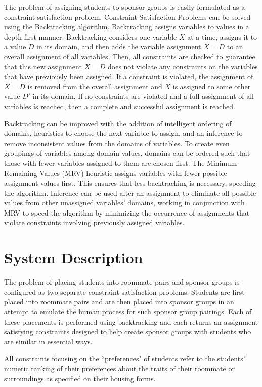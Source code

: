 \documentclass[letterpaper]{article}
\begin{document}
The problem of assigning students to sponsor groups is easily formulated as a constraint satisfaction problem. Constraint Satisfaction Problems can be solved using the Backtracking algorithm. Backtracking assigns variables to values in a depth-first manner. Backtracking considers one variable $X$ at a time, assigns it to a value $D$  in its domain, and then adds the variable assignment $X=D$ to an overall assignment of all variables. Then, all constraints are checked to guarantee that this new assignment $X=D$ does not violate any constraints on the variables that have previously been assigned. If a constraint is violated, the assignment of $X=D$ is removed from the overall assignment and $X$ is assigned to some other value $D'$ in its domain. If no constraints are violated and a full assignment of all variables is reached, then a complete and successful assignment is reached. 

Backtracking can be improved with the addition of intelligent ordering of domains, heuristics to choose the next variable to assign, and an inference to remove inconsistent values from the domains of variables. To create even groupings of variables among domain values, domains can be ordered such that those with fewer variables assigned to them are chosen first. The Minimum Remaining Values (MRV) heuristic assigns variables with fewer possible assignment values first. This ensures that less backtracking is necessary, speeding the algorithm. Inference can be used after an assignment to eliminate all possible values from other unassigned variables' domains, working in conjunction with MRV to speed the algorithm by minimizing the occurrence of assignments that violate constraints involving previously assigned variables. 

\section{System Description}
The problem of placing students into roommate pairs and sponsor groups is configured as two separate constraint satisfaction problems. Students are first placed into roommate pairs and are then placed into sponsor groups in an attempt to emulate the human process for such sponsor group pairings. Each of these placements is performed using backtracking and each returns an assignment satisfying constraints designed to help create sponsor groups with students who are similar in essential ways.

All constraints focusing on the ``preferences" of students refer to the students'  numeric ranking of their preferences about the traits of their roommate or surroundings as specified on their housing forms.
\end{document}
